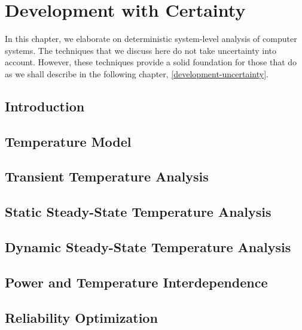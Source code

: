 \chapter{Development with Certainty}

In this chapter, we elaborate on deterministic system-level analysis of computer
systems. The techniques that we discuss here do not take uncertainty into
account. However, these techniques provide a solid foundation for those that do
as we shall describe in the following chapter, \cref{development-uncertainty}.

\section{Introduction}


\section{Temperature Model}


\section{Transient Temperature Analysis}


\section{Static Steady-State Temperature Analysis}


\section{Dynamic Steady-State Temperature Analysis}


\section{Power and Temperature Interdependence}


\section{Reliability Optimization}


